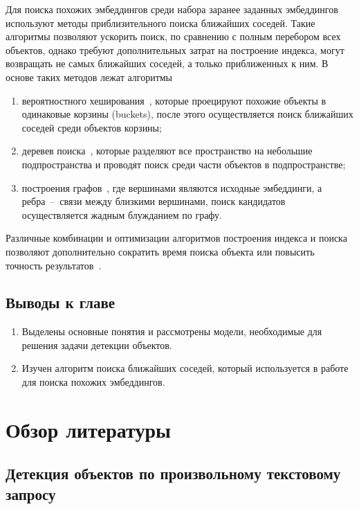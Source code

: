 \documentclass[a4paper,14pt]{article}
\begin{document}
    Для поиска похожих эмбеддингов среди набора заранее заданных эмбеддингов используют методы приблизительного поиска ближайших соседей.
    Такие алгоритмы позволяют ускорить поиск, по сравнению с полным перебором всех объектов, однако требуют дополнительных затрат на построение индекса,
    могут возвращать не самых ближайших соседей, а только приближенных к ним.
    В основе таких методов лежат алгоритмы
    \begin{enumerate}
        [1)]
        \itemsep0em
        \item вероятностного хеширования~\cite{tao2010efficient}, которые проецируют похожие объекты в одинаковые корзины (buckets), после этого осуществляется поиск ближайших соседей среди объектов корзины;
        \item деревев поиска~\cite{liu2006new}, которые разделяют все пространство на небольшие подпространства и проводят поиск среди части объектов в подпространстве;
        \item построения графов~\cite{malkov2018efficient}, где вершинами являются исходные эмбеддинги, а
        ребра~--~связи между близкими вершинами, поиск кандидатов осуществляется жадным блужданием по графу.
    \end{enumerate}
    Различные комбинации и оптимизации алгоритмов построения индекса и поиска позволяют дополнительно сократить время поиска объекта или повысить точность результатов~\cite{annoy,avq_2020}.

    \subsection{Выводы к главе \thesection}
    \begin{enumerate}
        \itemsep0em
        \item Выделены основные понятия и рассмотрены модели, необходимые для решения задачи детекции объектов.
        \item Изучен алгоритм поиска ближайших соседей, который используется в работе для поиска похожих эмбеддингов.
    \end{enumerate}

    \newpage


    \section{Обзор литературы}

    \subsection{Детекция объектов по произвольному текстовому запросу}
\end{document}
